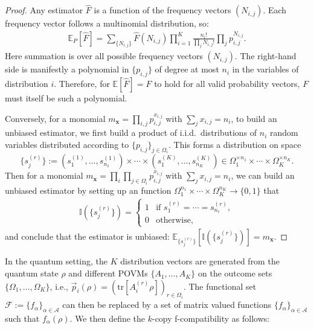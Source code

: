 \documentclass[aps,%
twocolumn,%
floatfix,%
pra,%
amsfonts,%
groupedaddress,%
superscriptaddress]{revtex4-2}%
\newcommand{\1}{\mathbbm{1}}
\begin{document}
\begin{proof}
Any estimator $\hat{F}$ is a function of the frequency vectors $(N_{i,j})$. Each frequency vector follows a multinomial distribution, so:
\begin{align}
\mathbb{E}_P[\hat{F}] = \sum_{\{N_{i,j}\}} \hat{F}(N_{i,j}) \prod_{i=1}^K \frac{n_i!}{\prod_j N_{i,j}!} \prod_j p_{i,j}^{N_{i,j}}.
\end{align}
Here summation is over all possible frequency vectors $(N_{i,j})$.
The right-hand side is manifestly a polynomial in $\{p_{i,j}\}$ of degree at most $n_i$ in the variables of distribution $i$. 
Therefore, for $\mathbb{E}[\hat{F}] = F$ to hold for all valid probability vectors, $F$ must itself be such a polynomial.

Conversely, for a monomial $m_{\mathbf{x}} = \prod_{i,j} p_{i,j}^{x_{i,j}}$ with $\sum_j x_{i,j} = n_i$, to build an unbiased estimator, we first build a product of i.i.d.\ distributions of $n_i$ random variables distributed according to $\{p_{i,j}\}_{j \in \Omega_i}$.
This forms a distribution on space 
$$
\{s^{(r)}_{j}\}:= (s^{(1)}_{1}, \ldots, s^{(1)}_{n_{1}}) \times  \cdots \times (s^{(K)}_{1}, \ldots, s^{(K)}_{n_{K}}) \in \Omega_1^{\times n_1} \times \cdots \times \Omega_K^{\times n_K}.
$$
Then for a monomial $m_{\mathbf{x}} = \prod_{i} \prod_{j \in \Omega_i} p_{i,j}^{x_{i,j}}$ with $\sum_j x_{i,j} = n_i$, we can build an unbiased estimator by setting up an function $\Omega_1^{n_1} \times \cdots \times \Omega_K^{n_K} \to \{0,1\}$ that 
\begin{align}
\mathbb{I}(\{s^{(r)}_{j}\}) = \begin{cases}
1 & \text{if } s^{(r)}_{1} = \cdots = s^{(r)}_{n_r}, \\
0 & \text{otherwise},
\end{cases}
\end{align}
and conclude that the estimator is unbiased: $\mathbb{E}_{\{s^{(r)}_{j}\}}\!\left[\mathbb{I}(\{s^{(r)}_{j}\})\right] = m_{\mathbf{x}}$.
\end{proof}


In the quantum setting, the $K$ distribution vectors are generated from the quantum state $\rho$ and different POVMs $\{A_1,\ldots,A_K\}$ on the outcome sets $\{\Omega_1,\ldots,\Omega_K\}$, i.e., $\vec{p}_i(\rho) = (\mathrm{tr}[A_i^{(r)}\rho])_{r \in \Omega_i}$.
The functional set $\mathcal{F}:=\{f_\alpha\}_{\alpha \in \mathcal{A}}$ can then be replaced by a set of matrix valued functions $\{f_\alpha\}_{\alpha \in \mathcal{A}}$ such that $f_\alpha(\rho)$.
We then define the $k$-copy f-compatibility as follows:
\end{document}
